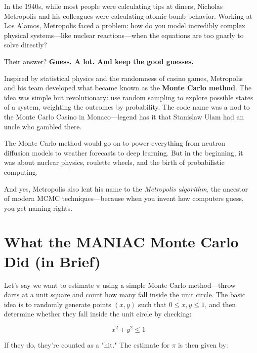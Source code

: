   \begin{tcolorbox}[colback=gray!5!white,colframe=black!75!white,title=Historical Sidebar: Nicholas Metropolis and the Monte Carlo Method,fonttitle=\bfseries]

    In the 1940s, while most people were calculating tips at diners, Nicholas Metropolis and his colleagues were calculating atomic bomb behavior. Working at Los Alamos, Metropolis faced a problem: how do you model incredibly complex physical systems—like nuclear reactions—when the equations are too gnarly to solve directly?
    
    Their answer? \textbf{Guess. A lot. And keep the good guesses.}
    
    Inspired by statistical physics and the randomness of casino games, Metropolis and his team developed what became known as the \textbf{Monte Carlo method}. The idea was simple but revolutionary: use random sampling to explore possible states of a system, weighting the outcomes by probability. The code name was a nod to the Monte Carlo Casino in Monaco—legend has it that Stanislaw Ulam had an uncle who gambled there.
    
    The Monte Carlo method would go on to power everything from neutron diffusion models to weather forecasts to deep learning. But in the beginning, it was about nuclear physics, roulette wheels, and the birth of probabilistic computing.
    
    And yes, Metropolis also lent his name to the \textit{Metropolis algorithm}, the ancestor of modern MCMC techniques—because when you invent how computers guess, you get naming rights.
    
    \end{tcolorbox}



    \section{What the MANIAC Monte Carlo Did (in Brief)}

    Let's say we want to estimate \( \pi \) using a simple Monte Carlo method—throw darts at a unit square and count how many fall inside the unit circle. The basic idea is to randomly generate points \((x, y)\) such that \(0 \leq x, y \leq 1\), and then determine whether they fall inside the unit circle by checking:
    
    \[
    x^2 + y^2 \leq 1
    \]
    
    If they do, they're counted as a "hit." The estimate for \( \pi \) is then given by:
    
